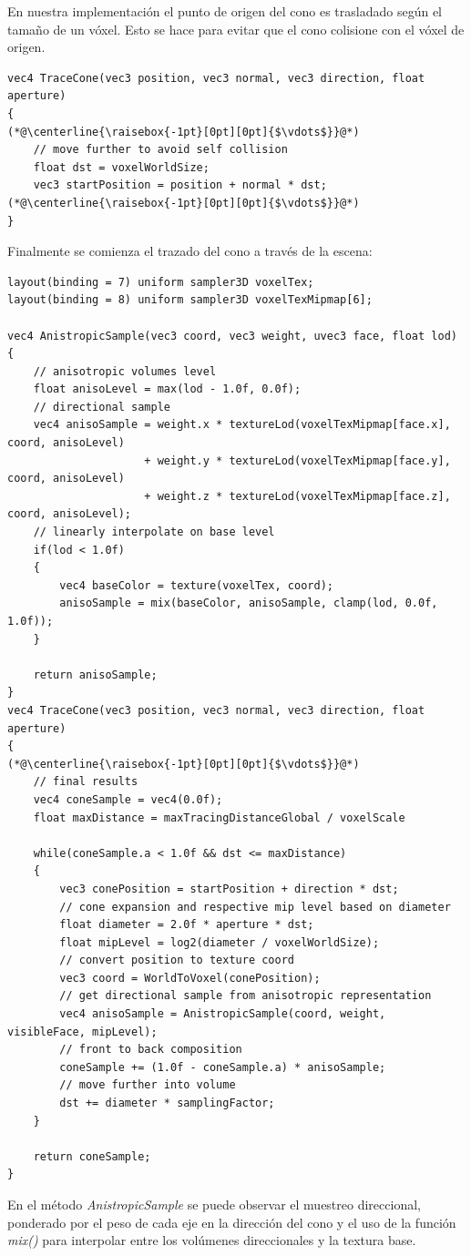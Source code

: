 En nuestra implementación el punto de origen del cono es trasladado según el tamaño de un vóxel. Esto se hace para evitar que el cono colisione con el vóxel de origen.
\\
\begin{lstlisting}[caption={Traslado de origen del cono.}, label=Trace1]
vec4 TraceCone(vec3 position, vec3 normal, vec3 direction, float aperture)
{
(*@\centerline{\raisebox{-1pt}[0pt][0pt]{$\vdots$}}@*)
    // move further to avoid self collision
    float dst = voxelWorldSize;
    vec3 startPosition = position + normal * dst;
(*@\centerline{\raisebox{-1pt}[0pt][0pt]{$\vdots$}}@*)
}
\end{lstlisting}
Finalmente se comienza el trazado del cono a través de la escena:
\\
\begin{lstlisting}[caption={Trazado de cono con vóxeles.}, label=Trace2]
layout(binding = 7) uniform sampler3D voxelTex;
layout(binding = 8) uniform sampler3D voxelTexMipmap[6];

vec4 AnistropicSample(vec3 coord, vec3 weight, uvec3 face, float lod)
{
    // anisotropic volumes level
    float anisoLevel = max(lod - 1.0f, 0.0f);
    // directional sample
    vec4 anisoSample = weight.x * textureLod(voxelTexMipmap[face.x], coord, anisoLevel)
                     + weight.y * textureLod(voxelTexMipmap[face.y], coord, anisoLevel)
                     + weight.z * textureLod(voxelTexMipmap[face.z], coord, anisoLevel);
    // linearly interpolate on base level
    if(lod < 1.0f)
    {
        vec4 baseColor = texture(voxelTex, coord);
        anisoSample = mix(baseColor, anisoSample, clamp(lod, 0.0f, 1.0f));
    }

    return anisoSample;                    
}
vec4 TraceCone(vec3 position, vec3 normal, vec3 direction, float aperture)
{
(*@\centerline{\raisebox{-1pt}[0pt][0pt]{$\vdots$}}@*)
    // final results
    vec4 coneSample = vec4(0.0f);
    float maxDistance = maxTracingDistanceGlobal / voxelScale

    while(coneSample.a < 1.0f && dst <= maxDistance)
    {
        vec3 conePosition = startPosition + direction * dst;
        // cone expansion and respective mip level based on diameter
        float diameter = 2.0f * aperture * dst;
        float mipLevel = log2(diameter / voxelWorldSize);
        // convert position to texture coord
        vec3 coord = WorldToVoxel(conePosition);
        // get directional sample from anisotropic representation
        vec4 anisoSample = AnistropicSample(coord, weight, visibleFace, mipLevel);
        // front to back composition
        coneSample += (1.0f - coneSample.a) * anisoSample;
        // move further into volume
        dst += diameter * samplingFactor;
    }

    return coneSample;
}
\end{lstlisting}
En el método \emph{AnistropicSample} se puede observar el muestreo direccional, ponderado por el peso de cada eje en la dirección del cono y el uso de la función \emph{mix()} para interpolar entre los volúmenes direccionales y la textura base. 

